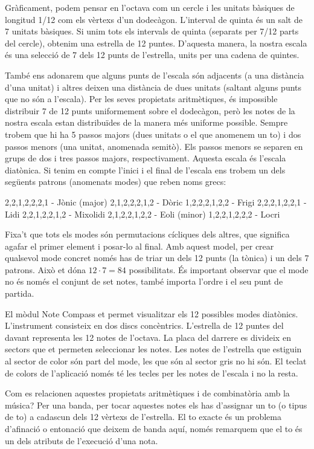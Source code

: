 Gràficament, podem pensar en l'octava com un cercle i les unitats bàsiques de longitud 1/12 com els vèrtexs d'un dodecàgon. L'interval de quinta és un salt de 7 unitats bàsiques. Si unim tots els intervals de quinta (separats per 7/12 parts del cercle), obtenim una estrella de 12 puntes. D'aquesta manera, la nostra escala és una selecció de 7 dels 12 punts de l'estrella, units per una cadena de quintes.

També ens adonarem que alguns punts de l'escala són adjacents (a una distància d'una unitat) i altres deixen una distància de dues unitats (saltant alguns punts que no són a l'escala). Per les seves propietats aritmètiques, és impossible distribuir 7 de 12 punts uniformement sobre el dodecàgon, però les notes de la nostra escala estan distribuïdes de la manera més uniforme possible. Sempre trobem que hi ha 5 passos majors (dues unitats o el que anomenem un to) i dos passos menors (una unitat, anomenada semitò). Els passos menors se separen en grups de  dos i tres passos majors, respectivament. Aquesta escala és l'escala diatònica. Si tenim en compte l'inici i el final de l'escala ens trobem un dels següents patrons (anomenats modes) que reben noms grecs:

	2,2,1,2,2,2,1 - Jònic (major)
	2,1,2,2,2,1,2 - Dòric
	1,2,2,2,1,2,2 - Frigi
	2,2,2,1,2,2,1 - Lidi
	2,2,1,2,2,1,2 - Mixolidi
	2,1,2,2,1,2,2 - Eoli (minor)
	1,2,2,1,2,2,2 - Locri

Fixa't que tots els modes són permutacions cícliques dels altres, que significa agafar el primer element i posar-lo al final. Amb aquest model, per crear qualsevol mode concret només has de triar un dels 12 punts (la tònica) i un dels 7 patrons. Això et dóna  $12\cdot 7=84$ possibilitats. És important observar que el mode no és només el conjunt de set notes, també importa l'ordre i el seu punt de partida.

El mòdul Note Compass et permet visualitzar els 12 possibles modes diatònics. L'instrument consisteix en dos discs concèntrics. L'estrella de 12 puntes del davant representa les 12 notes de l'octava. La placa del darrere es divideix en sectors que et permeten seleccionar les notes. Les notes de l'estrella que estiguin al sector de color són part del mode, les que són al sector gris no hi són. El teclat de colors de l'aplicació només té les tecles per les notes de l'escala i no la resta.

Com es relacionen aquestes propietats aritmètiques i de combinatòria amb la música? Per una banda, per tocar aquestes notes els has d'assignar un to (o tipus de to) a cadascun dels 12 vèrtexs de l'estrella. El to exacte és un problema d'afinació o entonació que deixem de banda aquí, només remarquem que el to és un dels atributs de l'execució d'una nota.

